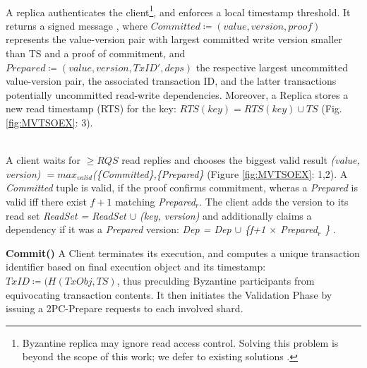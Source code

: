 \\
A replica authenticates the client\footnote{Byzantine replica may ignore read access control. Solving this problem is beyond the scope of this work; we defer to existing solutions \cite{basu2019efficient}.}, and enforces a local timestamp threshold.  It returns a signed message , where $Committed \coloneqq (value, version, proof)$ represents the value-version pair with largest committed write version smaller than TS and a proof of commitment,  and $Prepared \coloneqq (value, version, TxID', deps)$ the respective largest uncommitted value-version pair, the associated transaction ID, and the latter transactions potentially uncommitted read-write dependencies. Moreover, a Replica stores a new read timestamp (RTS) for the key: $RTS(key) = RTS(key) \cup TS$ (Fig. \ref{fig:MVTSOEX}: 3). 

\\
A client waits for $\geq RQS$ read replies and chooses the biggest valid result \textit{(value, version) $= max_{valid}$(\{Committed\},\{Prepared\}} (Figure \ref{fig:MVTSOEX}: 1,2). A \textit{Committed} tuple is valid, if the proof confirms commitment, wheras a \textit{Prepared} is valid iff there exist $f+1$ matching \textit{Prepared$_r$}. The client adds the version to its read set \textit{ReadSet = ReadSet $\cup$ (key, version)} and additionally claims a dependency if it was a \textit{Prepared} version: \textit{Dep = Dep $\cup$ \{f+1 $\times$ Prepared$_r$ \}} . 

\textbf{Commit()} A Client terminates its execution, and computes a unique transaction identifier based on final execution object and its timestamp: $TxID \coloneqq (H(TxObj, TS)$, thus preculding Byzantine participants from equivocating transaction contents. It then initiates the Validation Phase by issuing a 2PC-Prepare requests to each involved shard.

